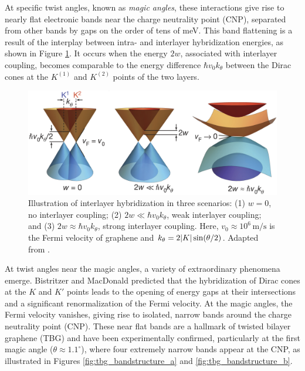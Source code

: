 At specific twist angles, known as \textit{magic angles}, these interactions give rise to nearly flat electronic bands near the charge neutrality point (CNP), separated from other bands by gaps on the order of tens of meV. This band flattening is a result of the interplay between intra- and interlayer hybridization energies, as shown in Figure \ref{fig:tbg_dirac_cones}. It occurs when the energy \(2w\), associated with interlayer coupling, becomes comparable to the energy difference \(\hbar v_0 k_\theta\) between the Dirac cones at the \(K^{(1)}\) and \(K^{(2)}\) points of the two layers.

\begin{figure}[H]
\centering
\includegraphics[width=0.60\linewidth]{fig/tbg_dirac_cones}
\caption{Illustration of interlayer hybridization in three scenarios: (1) \( w = 0 \), no interlayer coupling; (2) \( 2w \ll \hbar v_0 k_\theta \), weak interlayer coupling; and (3) \( 2w \approx \hbar v_0 k_\theta \), strong interlayer coupling. Here, \( v_0 \approx 10^6 \, \text{m/s} \) is the Fermi velocity of graphene and $k_\theta = 2 \abs{K} \sin(\theta/2)$. Adapted from \cite{cao2018_correlated}.}
\label{fig:tbg_dirac_cones}
\end{figure}

At twist angles near the magic angles, a variety of extraordinary phenomena emerge. Bistritzer and MacDonald \cite{macdonald2011} predicted that the hybridization of Dirac cones at the \(K\) and \(K'\) points leads to the opening of energy gaps at their intersections and a significant renormalization of the Fermi velocity. At the magic angles, the Fermi velocity vanishes, giving rise to isolated, narrow bands around the charge neutrality point (CNP). These near flat bands are a hallmark of twisted bilayer graphene (TBG) and have been experimentally confirmed, particularly at the first magic angle (\(\theta \approx 1.1^\circ\)), where four extremely narrow bands appear at the CNP, as illustrated in Figures \ref{fig:tbg_bandstructure_a} and \ref{fig:tbg_bandstructure_b}.

